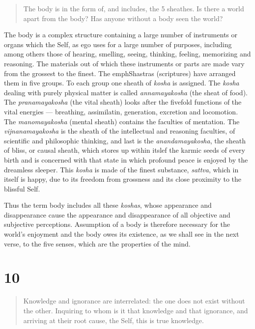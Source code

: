 \documentclass[12pt]{report}
\begin{document}
\begin{quote}
The body is in the form of, and includes, the 5 sheathes. Is there a
world apart from the body? Has anyone without a body seen the world?
\end{quote}


The body is a complex structure containing a large number of
instruments or organs which the Self, as ego uses for a large number
of purposes, including among others those of hearing, smelling,
seeing, thinking, feeling, memorizing and reasoning. The materials out
of which these instruments or parts are made vary from the grossest to
the finest. The emph{Shastras} (scriptures) have arranged them in five
groups. To each group one sheath of \emph{kosha} is assigned. The
\emph{kosha} dealing with purely physical matter is called
\emph{annamayakosha} (the sheat of food). The \emph{pranamayakosha}
(the vital sheath) looks after the fivefold functions of the vital
energies --- breathing, assimilatin, generation, excretion and
locomotion. The \emph{manomayakosha} (mental sheath) contains the
faculties of mentation. The \emph{vijnanamayakosha} is the sheath of
the intellectual and reasoning faculties, of scientific and
philosophic thinking, and last is the \emph{anandamayakosha}, the
sheath of bliss, or causal sheath, which stores up within itslef the
karmic seeds of every birth and is concerned with that state in which
profound peace is enjoyed by the dreamless sleeper. This \emph{kosha}
is made of the finest substance, \emph{sattva}, which in itself is
happy, due to its freedom from grossness and its close proximity to
the blissful Self.

Thus the term body includes all these \emph{koshas}, whose appearance
and disappearance cause the appearance and disappearance of all
objective and subjective perceptions. Assumption of a body is
therefore necessary for the world's enjoyment and the body owes its
existence, as we shall see in the next verse, to the five senses,
which are the properties of the mind.

\section{10}

\begin{quote}
Knowledge and ignorance are interrelated: the one does not exist
without the other. Inquiring to whom is it that knowledge and that
ignorance, and arriving at their root cause, the Self, this is true
knowledge. 
\end{quote}
\end{document}
